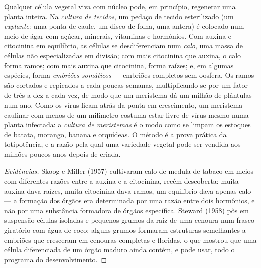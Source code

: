 \begin{proposition}\label{prop:b2:asexual-reproduction:tissueculture}
Qualquer célula vegetal viva com núcleo pode, em princípio, regenerar
uma planta inteira. Na \emph{cultura de tecidos}, um pedaço de tecido
esterilizado (um \emph{explante}: uma ponta de caule, um disco de
folha, uma antera) é colocado num meio de ágar com açúcar, minerais,
vitaminas e hormônios. Com auxina e citocinina em equilíbrio, as
células se desdiferenciam num \emph{calo}, uma massa de células não
especializadas em divisão; com mais citocinina que auxina, o calo forma
ramos; com mais auxina que citocinina, forma raízes; e, em algumas
espécies, forma \emph{embriões somáticos} --- embriões completos sem
oosfera. Os ramos são cortados e repicados a cada poucas semanas,
multiplicando-se por um fator de três a dez a cada vez, de modo que um
meristema dá um milhão de plântulas num ano. Como os vírus ficam
atrás da ponta em crescimento, um meristema caulinar com menos de um
milímetro costuma estar livre de vírus mesmo numa planta infectada: a
\emph{cultura de meristemas} é o modo como se limpam os estoques de
batata, morango, banana e orquídeas. O método é a prova prática da
totipotência, e a razão pela qual uma variedade vegetal pode ser
vendida aos milhões poucos anos depois de criada.
\end{proposition}
\begin{proof}[Evidências]
Skoog e Miller (1957) cultivaram calo de medula de tabaco em meios com
diferentes razões entre a auxina e a citocinina, recém-descoberta:
muita auxina dava raízes, muita citocinina dava ramos, um equilíbrio
dava apenas calo --- a formação dos órgãos era determinada por uma
razão entre dois hormônios, e não por uma substância formadora de
órgãos específica. Steward (1958) pôs em suspensão células isoladas e
pequenos grumos da raiz de uma cenoura num frasco giratório com água de
coco: alguns grumos formaram estruturas semelhantes a embriões que
cresceram em cenouras completas e floridas, o que mostrou que uma célula
diferenciada de um órgão maduro ainda contém, e pode usar, todo o
programa do desenvolvimento.
\end{proof}

